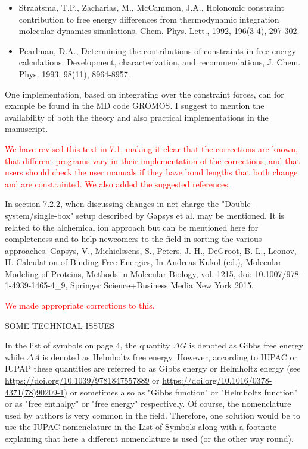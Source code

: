 \documentclass[11pt,a4paper]{letter} %
\begin{document}
\begin{letter}
\begin{itemize}
    \item Straatsma, T.P., Zacharias, M., McCammon, J.A., Holonomic constraint contribution to free energy differences from thermodynamic integration molecular dynamics simulations, Chem. Phys. Lett., 1992, 196(3-4), 297-302.

    \item Pearlman, D.A., Determining the contributions of constraints in free energy calculations: Development, characterization, and recommendations, J. Chem. Phys. 1993, 98(11), 8964-8957.
 
\end{itemize}
One implementation, based on integrating over the constraint forces, can for example be found in the MD code GROMOS. I suggest to mention the availability of both the theory and also practical implementations in the manuscript.

\textcolor{red}{We have revised this text in 7.1, making it clear that the corrections are known, that different programs vary in their implementation of the corrections, and that users should check the user manuals if they have bond lengths that both change and are constrainted. We also added the suggested references.}

In section 7.2.2, when discussing changes in net charge the "Double-system/single-box" setup described by Gapsys et al. may be mentioned. It is related to the alchemical ion approach but can be mentioned here for completeness and to help newcomers to the field in sorting the various approaches. Gapsys, V., Michielssens, S., Peters, J. H., DeGroot, B. L., Leonov, H. Calculation of Binding Free Energies, In Andreas Kukol (ed.), Molecular Modeling of Proteins, Methods in Molecular Biology, vol. 1215, doi: 10.1007/978-1-4939-1465-4\_9, Springer Science+Business Media New York 2015.

\textcolor{red}{We made appropriate corrections to this. }

SOME TECHNICAL ISSUES

In the list of symbols on page 4, the quantity $\Delta G$ is denoted as Gibbs free energy while $\Delta A$ is denoted as Helmholtz free energy. However, according to IUPAC or IUPAP these quantities are referred to as Gibbs energy or Helmholtz energy (see \url{https://doi.org/10.1039/9781847557889} or \url{https://doi.org/10.1016/0378-4371(78)90209-1}) or sometimes also as "Gibbs function" or "Helmholtz function" or as "free enthalpy" or "free energy" respectively. Of course, the nomenclature used by authors is very common in the field. Therefore, one solution would be to use the IUPAC nomenclature in the List of Symbols along with a footnote explaining that here a different nomenclature is used (or the other way round).


\end{letter}
\end{document}

